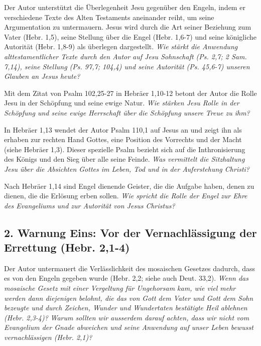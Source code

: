 \documentclass[
  12pt,
]{krantz}
\begin{document}
Der Autor unterstützt die Überlegenheit Jesu gegenüber den Engeln, indem er verschiedene Texte des Alten Testaments aneinander reiht, um seine Argumentation zu untermauern. Jesus wird durch die Art seiner Beziehung zum Vater (Hebr. 1,5), seine Stellung über die Engel (Hebr. 1,6-7) und seine königliche Autorität (Hebr. 1,8-9) als überlegen dargestellt. \emph{Wie stärkt die Anwendung alttestamentlicher Texte durch den Autor auf Jesu Sohnschaft (Ps. 2,7; 2 Sam. 7,14), seine Stellung (Ps. 97,7; 104,4) und seine Autorität (Ps. 45,6-7) unseren Glauben an Jesus heute?}

Mit dem Zitat von Psalm 102,25-27 in Hebräer 1,10-12 betont der Autor die Rolle Jesu in der Schöpfung und seine ewige Natur. \emph{Wie stärken Jesu Rolle in der Schöpfung und seine ewige Herrschaft über die Schöpfung unsere Treue zu ihm?}

In Hebräer 1,13 wendet der Autor Psalm 110,1 auf Jesus an und zeigt ihn als erhaben zur rechten Hand Gottes, eine Position des Vorrechts und der Macht (siehe Hebräer 1,3). Dieser spezielle Psalm bezieht sich auf die Inthronisierung des Königs und den Sieg über alle seine Feinde. \emph{Was vermittelt die Sitzhaltung Jesu über die Absichten Gottes im Leben, Tod und in der Auferstehung Christi?}

Nach Hebräer 1,14 sind Engel dienende Geister, die die Aufgabe haben, denen zu dienen, die die Erlösung erben sollen. \emph{Wie spricht die Rolle der Engel zur Ehre des Evangeliums und zur Autorität von Jesus Christus?}

\hypertarget{warnung-eins-vor-der-vernachluxe4ssigung-der-errettung-hebr.-21-4}{%
\subsection{2. Warnung Eins: Vor der Vernachlässigung der Errettung (Hebr. 2,1-4)}\label{warnung-eins-vor-der-vernachluxe4ssigung-der-errettung-hebr.-21-4}}

Der Autor untermauert die Verlässlichkeit des mosaischen Gesetzes dadurch, dass es von den Engeln gegeben wurde (Hebr. 2,2; siehe auch Deut. 33,2). \emph{Wenn das mosaische Gesetz mit einer Vergeltung für Ungehorsam kam, wie viel mehr werden dann diejenigen belohnt, die das von Gott dem Vater und Gott dem Sohn bezeugte und durch Zeichen, Wunder und Wundertaten bestätigte Heil ablehnen (Hebr. 2,3-4)?} \emph{Warum sollten wir ausserdem darauf achten, dass wir nicht vom Evangelium der Gnade abweichen und seine Anwendung auf unser Leben bewusst vernachlässigen (Hebr. 2,1)?}
\end{document}

